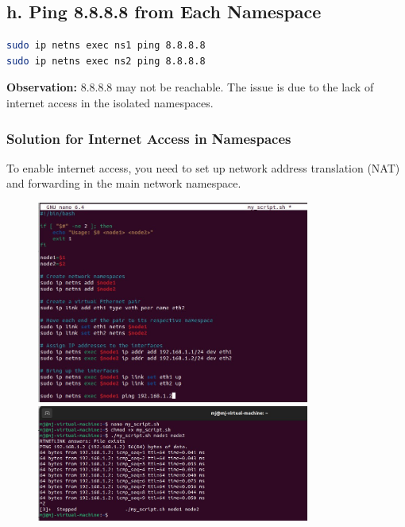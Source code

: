 \documentclass{report}
\begin{document}
\subsection*{h. Ping 8.8.8.8 from Each Namespace}

\begin{lstlisting}[language=bash]
sudo ip netns exec ns1 ping 8.8.8.8
sudo ip netns exec ns2 ping 8.8.8.8
\end{lstlisting}

\textbf{Observation:} 8.8.8.8 may not be reachable. The issue is due to the lack of internet access in the isolated namespaces.

\subsubsection*{Solution for Internet Access in Namespaces}

To enable internet access, you need to set up network address translation (NAT) and forwarding in the main network namespace.\cite{9}

\begin{figure}[h] 
  \centering  
  \includegraphics[width=0.8\textwidth]{33.jpg} 
  \centering 
  \includegraphics[width=0.8\textwidth]{34.jpg} 
\end{figure} 
\end{document}
